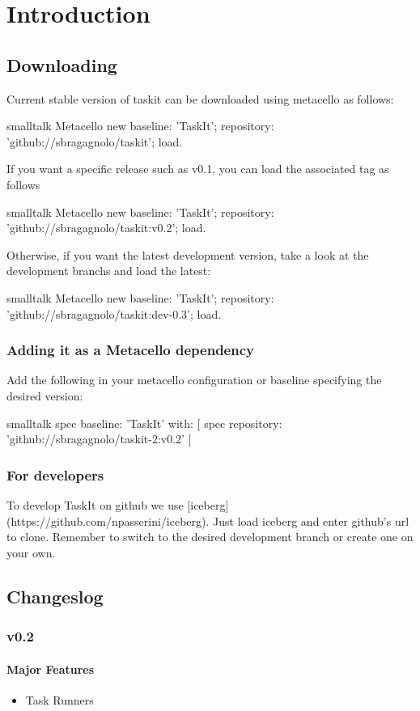 \documentclass[10pt,twoside,english]{_support/latex/sbabook/sbabook}
\begin{document}
\chapter{Introduction}\section{Downloading}
Current stable version of taskit can be downloaded using metacello as follows:

\begin{displaycode}{smalltalk}
Metacello new
  baseline: 'TaskIt';
  repository: 'github://sbragagnolo/taskit';
  load.
\end{displaycode}

If you want a specific release such as v0.1, you can load the associated tag as follows

\begin{displaycode}{smalltalk}
Metacello new
  baseline: 'TaskIt';
  repository: 'github://sbragagnolo/taskit:v0.2';
  load.
\end{displaycode}

Otherwise, if you want the latest development version, take a look at the development branchs and load the latest:

\begin{displaycode}{smalltalk}
Metacello new
  baseline: 'TaskIt';
  repository: 'github://sbragagnolo/taskit:dev-0.3';
  load.
\end{displaycode}
\subsection{Adding it as a Metacello dependency}
Add the following in your metacello configuration or baseline specifying the desired version:

\begin{displaycode}{smalltalk}
spec
    baseline: 'TaskIt'
    with: [ spec repository: 'github://sbragagnolo/taskit-2:v0.2' ]
\end{displaycode}
\subsection{For developers}
To develop TaskIt on github we use {[}iceberg{]}(https://github.com/npasserini/iceberg). Just load iceberg and enter github's url to clone. Remember to switch to the desired development branch or create one on your own.
\section{Changeslog}\subsection{v0.2}\subsubsection{Major Features}
\begin{itemize}
\item Task Runners
\end{itemize}
\end{document}

